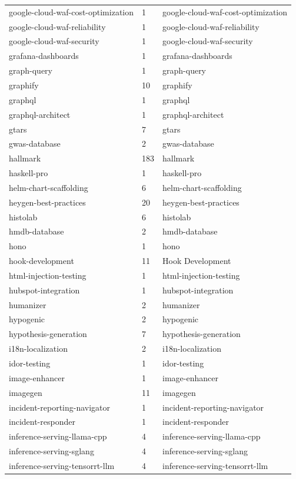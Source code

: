 \begin{longtable}{@{}lll@{}}
google-cloud-waf-cost-optimization & 1 & google-cloud-waf-cost-optimization\\
google-cloud-waf-reliability & 1 & google-cloud-waf-reliability\\
google-cloud-waf-security & 1 & google-cloud-waf-security\\
grafana-dashboards & 1 & grafana-dashboards\\
graph-query & 1 & graph-query\\
graphify & 10 & graphify\\
graphql & 1 & graphql\\
graphql-architect & 1 & graphql-architect\\
gtars & 7 & gtars\\
gwas-database & 2 & gwas-database\\
hallmark & 183 & hallmark\\
haskell-pro & 1 & haskell-pro\\
helm-chart-scaffolding & 6 & helm-chart-scaffolding\\
heygen-best-practices & 20 & heygen-best-practices\\
histolab & 6 & histolab\\
hmdb-database & 2 & hmdb-database\\
hono & 1 & hono\\
hook-development & 11 & Hook Development\\
html-injection-testing & 1 & html-injection-testing\\
hubspot-integration & 1 & hubspot-integration\\
humanizer & 2 & humanizer\\
hypogenic & 2 & hypogenic\\
hypothesis-generation & 7 & hypothesis-generation\\
i18n-localization & 2 & i18n-localization\\
idor-testing & 1 & idor-testing\\
image-enhancer & 1 & image-enhancer\\
imagegen & 11 & imagegen\\
incident-reporting-navigator & 1 & incident-reporting-navigator\\
incident-responder & 1 & incident-responder\\
inference-serving-llama-cpp & 4 & inference-serving-llama-cpp\\
inference-serving-sglang & 4 & inference-serving-sglang\\
inference-serving-tensorrt-llm & 4 & inference-serving-tensorrt-llm\\

\end{longtable}
